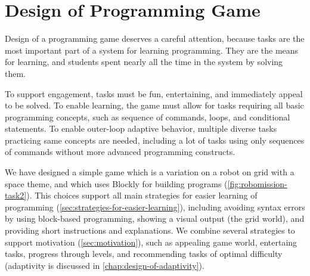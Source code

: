 \chapter{Design of Programming Game}
\label{chap:design-of-game}

Design of a programming game deserves a careful attention,
because tasks are the most important part of a system for learning programming.
They are the means for learning,
and students spent nearly all the time in the system by solving them.

To support engagement, tasks must be fun, entertaining,
and immediately appeal to be solved.  %
To enable learning, the game must allow for tasks requiring all basic
programming concepts, such as sequence of commands, loops, and conditional
statements. %
To enable outer-loop adaptive behavior, multiple diverse tasks practicing same
concepts are needed, including a lot of tasks using only sequences of commands
without more advanced programming constructs.


We have designed a simple game which is a variation on a robot
on grid with a space theme, and which uses Blockly for building programs
(\cref{fig:robomission-task2}).
This choices support all main strategies for easier learning of programming
(\cref{sec:strategies-for-easier-learning}),
including
avoiding syntax errors by using block-based programming,
showing a visual output (the grid world),
and providing short instructions and explanations. %
We combine several strategies to support motivation (\cref{sec:motivation}),
such as appealing game world, entertaing tasks, progress through levels,
and recommending tasks of optimal difficulty
(adaptivity is discussed in \cref{chap:design-of-adaptivity}).

